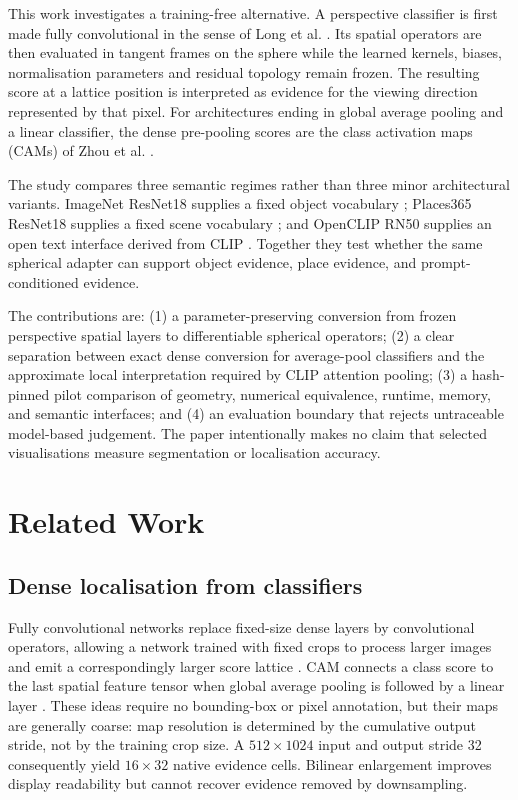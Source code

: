 \documentclass{isprs}
\begin{document}
This work investigates a training-free alternative.  A perspective classifier
is first made fully convolutional in the sense of Long et al.
\cite{long2015fcn}.  Its spatial operators are then evaluated in tangent frames
on the sphere while the learned kernels, biases, normalisation parameters and
residual topology remain frozen.  The resulting score at a lattice position is
interpreted as evidence for the viewing direction represented by that pixel.
For architectures ending in global average pooling and a linear classifier,
the dense pre-pooling scores are the class activation maps (CAMs) of Zhou et
al. \cite{zhou2016cam}.

The study compares three semantic regimes rather than three minor architectural
variants.  ImageNet ResNet18 supplies a fixed object vocabulary
\cite{deng2009imagenet,he2016resnet}; Places365 ResNet18 supplies a fixed scene
vocabulary \cite{zhou2018places}; and OpenCLIP RN50 supplies an open text
interface derived from CLIP \cite{radford2021clip}.  Together they test whether
the same spherical adapter can support object evidence, place evidence, and
prompt-conditioned evidence.

The contributions are: (1) a parameter-preserving conversion from frozen
perspective spatial layers to differentiable spherical operators; (2) a clear
separation between exact dense conversion for average-pool classifiers and the
approximate local interpretation required by CLIP attention pooling; (3) a
hash-pinned pilot comparison of geometry, numerical equivalence, runtime,
memory, and semantic interfaces; and (4) an evaluation boundary that rejects
untraceable model-based judgement.  The paper intentionally makes no claim
that selected visualisations measure segmentation or localisation accuracy.

\section{Related Work}

\subsection{Dense localisation from classifiers}

Fully convolutional networks replace fixed-size dense layers by convolutional
operators, allowing a network trained with fixed crops to process larger images
and emit a correspondingly larger score lattice \cite{long2015fcn}.  CAM
connects a class score to the last spatial feature tensor when global average
pooling is followed by a linear layer \cite{zhou2016cam}.  These ideas require
no bounding-box or pixel annotation, but their maps are generally coarse: map
resolution is determined by the cumulative output stride, not by the training
crop size.  A $512\!\times\!1024$ input and output stride 32 consequently yield
$16\!\times\!32$ native evidence cells.  Bilinear enlargement improves display
readability but cannot recover evidence removed by downsampling.
\end{document}
